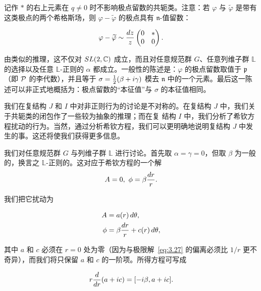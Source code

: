 记作 $*$ 的右上元素在 $q\not=0$ 时不影响极点留数的共轭类。注意：若 $\varphi$ 与 $\tilde\varphi$ 是带有这类极点的两个希格斯场，则 $\varphi-\tilde\varphi$ 的极点具有 $\mathfrak n$-值留数：

\setcounter{equation}{25}
\begin{equation}\label{eq:3.26}
  \varphi-\tilde\varphi\sim {dz\over
z}\left(\begin{matrix}0&*\\ 0&0\end{matrix}\right).
\end{equation}


由类似的推理，这不仅对 $SL(2,\C)$ 成立，而且对任意规范群 $G$、任意列维子群 $\mathbb{L}$ 的选择以及任意 $\mathbb{L}$-正则的 $\alpha$ 都成立。一般性的陈述是：$\varphi$ 的极点留数取值于 $\mathfrak p$（即 $\EUP$ 的李代数），并且等于 $\sigma=\half(\beta+i\gamma)$
模去 $\mathfrak n$ 中的一个元素。最后这一陈述可以非正式地概括为：极点留数的“本征值”与 $\sigma$ 的本征值相同。

\bigskip{}

我们在复结构 $J$ 和 $I$ 中对非正则行为的讨论是不对称的。在复结构 $J$ 中，我们关于共轭类的闭包作了一些较为抽象的推理；而在复
结构 $I$ 中，我们分析了希钦方程扰动的行为。当然，通过分析希钦方程，我们可以更明确地说明复结构 $J$ 中发生的事。这还将使我们获得更多信息。

我们对任意规范群 $G$ 与列维子群 $\mathbb{L}$ 进行讨论。首先取 $\alpha=\gamma=0$，但取 $\beta$ 为一般的，换言之 $\mathbb{L}$-正则的。这对应于希钦方程的一个解
\setcounter{equation}{26}
\begin{equation}\label{eq:3.27}
  A=0, ~\phi=\beta
{dr\over r}.
\end{equation}

我们把它扰动为

\setcounter{equation}{27}
\begin{equation}\label{eq:3.28}
  \begin{aligned}A&=a(r)\,d\theta,\\ \phi&=\beta{dr\over r}+c(r)\,d\theta,\end{aligned}
\end{equation}

其中 $a$ 和 $c$ 必须在 $r=0$ 处为零（因为与极限解~\eqref{eq:3.27} 的偏离必须比 $1/r$ 更不奇异），而我们将只保留 $a$ 和 $c$ 的一阶项。所得方程可写成

\setcounter{equation}{28}
\begin{equation}\label{eq:3.29}
  r{d\over dr}(a+ic)=[-i\beta,a+ic].
\end{equation}


